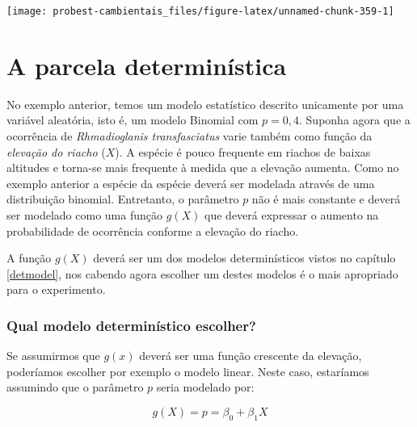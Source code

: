 \documentclass[
]{book}
\begin{document}
\begin{center}\texttt{[image: probest-cambientais\_files/figure-latex/unnamed-chunk-359-1]} \end{center}

\hypertarget{a-parcela-determinuxedstica}{%
\section{A parcela determinística}\label{a-parcela-determinuxedstica}}

No exemplo anterior, temos um modelo estatístico descrito unicamente por uma variável aleatória, isto é, um modelo Binomial com \(p = 0,4\). Suponha agora que a ocorrência de \emph{Rhmadioglanis transfasciatus} varie também como função da \emph{elevação do riacho} (\(X\)). A espécie é pouco frequente em riachos de baixas altitudes e torna-se mais frequente à medida que a elevação aumenta. Como no exemplo anterior a espécie da espécie deverá ser modelada através de uma distribuição binomial. Entretanto, o parâmetro \(p\) não é mais constante e deverá ser modelado como uma função \(g(X)\) que deverá expressar o aumento na probabilidade de ocorrência conforme a elevação do riacho.

A função \(g(X)\) deverá ser um dos modelos determinísticos vistos no capítulo \ref{detmodel}, nos cabendo agora escolher um destes modelos é o mais apropriado para o experimento.

\hypertarget{qual-modelo-determinuxedstico-escolher}{%
\subsubsection*{Qual modelo determinístico escolher?}\label{qual-modelo-determinuxedstico-escolher}}

Se assumirmos que \(g(x)\) deverá ser uma função crescente da elevação, poderíamos escolher por exemplo o modelo linear. Neste caso, estaríamos assumindo que o parâmetro \(p\) seria modelado por:

\[g(X) = p = \beta_0 + \beta_1 X\]
\end{document}
